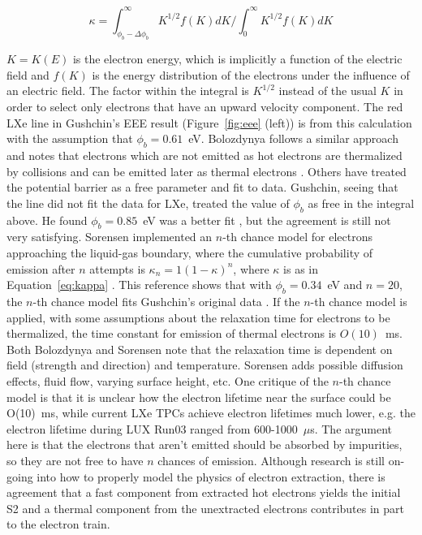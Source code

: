 \begin{equation}
\label{eq:kappa}
\kappa = \int_{\phi_{b} - \Delta\phi_{b}}^\infty K^{1/2} f(K) dK \Big / \int_{0}^{\infty} K^{1/2} f(K)dK
\end{equation}

$K = K(E)$ is the electron energy, which is implicitly a function of the electric field and $f(K)$ is the energy distribution of the electrons under the influence of an electric field. The factor within the integral is $K^{1/2}$ instead of the usual $K$ in order to select only electrons that have an upward velocity component. The red \ac{LXe} line in Gushchin's \ac{EEE} result (Figure~\ref{fig:eee} (left)) is from this calculation with the assumption that $\phi_{b}=0.61$~eV. Bolozdynya follows a similar approach and notes that electrons which are not emitted as hot electrons are thermalized by collisions and can be emitted later as thermal electrons \cite{Bolozdynya1999}. Others have treated the potential barrier as a free parameter and fit to data. Gushchin, seeing that the line did not fit the data for \ac{LXe}, treated the value of $\phi_{b}$ as free in the integral above. He found $\phi_{b}= 0.85$~eV was a better fit \cite{Gushchin1982}, but the agreement is still not very satisfying. Sorensen implemented an $n$-th chance model for electrons approaching the liquid-gas boundary, where the cumulative probability of emission after $n$ attempts is $\kappa_{n} = 1 (1-\kappa)^{n}$, where $\kappa$ is as in Equation~\ref{eq:kappa} \cite{Sorensen2017}. This reference shows that with $\phi_{b}= 0.34$~eV and $n=20$, the $n$-th chance model fits Gushchin's original data \cite{Sorensen2017}. If the $n$-th chance model is applied, with some assumptions about the relaxation time for electrons to be thermalized, the time constant for emission of thermal electrons is $O(10)$~ms. Both Bolozdynya \cite{Bolozdynya1999} and Sorensen \cite{Sorensen2017} note that the relaxation time is dependent on field (strength and direction) and temperature. Sorensen adds possible diffusion effects, fluid flow, varying surface height, etc. One critique of the $n$-th chance model is that it is unclear how the electron lifetime near the surface could be O(10)~ms, while current \ac{LXe} \ac{TPC}s achieve electron lifetimes much lower, e.g. the electron lifetime during \ac{LUX} Run03 ranged from 600-1000~$\mu$s. The argument here is that the electrons that aren't emitted should be absorbed by impurities, so they are not free to have $n$ chances of emission. Although research is still on-going into how to properly model the physics of electron extraction, there is agreement that a fast component from extracted hot electrons yields the initial S2 and a thermal component from the unextracted electrons contributes in part to the electron train.


